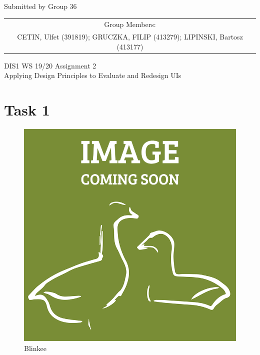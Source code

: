 \documentclass[a4paper,11pt,oneside]{scrreprt}
\begin{document}
\begin{center}
	Submitted by Group 36
	
	\bigskip
	
	\begin{tabular}{c}
	Group Members: \\
	CETIN, Ulfet (391819); GRUCZKA, FILIP (413279);	LIPINSKI, Bartosz (413177) \\
	\end{tabular}

	\bigskip
	
	DIS1 WS 19/20 Assignment 2\\
	Applying Design Principles to Evaluate and Redesign UIs
	
\end{center}

\section*{Task 1}

\begin{figure}[H]
	\centering
	\includegraphics[clip, trim=0cm 0cm 0cm 0cm, scale=0.33]{./images/redesign.png}
	\caption{Blinkee}
	\label{fig:sub3}
\end{figure}
\end{document}
